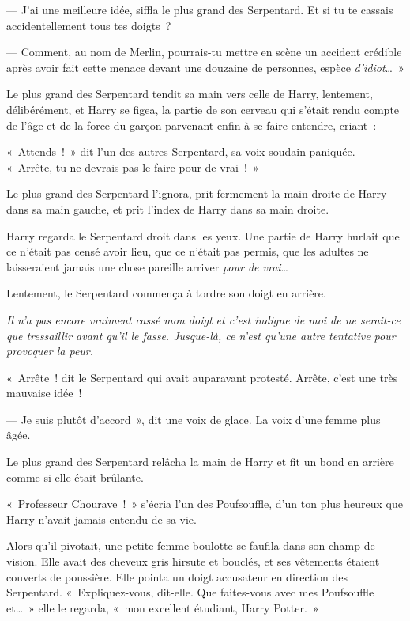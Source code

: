 --- J'ai une meilleure idée, siffla le plus grand des Serpentard. Et si tu te cassais accidentellement tous tes doigts~?

--- Comment, au nom de Merlin, pourrais-tu mettre en scène un accident crédible après avoir fait cette menace devant une douzaine de personnes, espèce \emph{d'idiot}…~»

Le plus grand des Serpentard tendit sa main vers celle de Harry, lentement, délibérément, et Harry se figea, la partie de son cerveau qui s'était rendu compte de l'âge et de la force du garçon parvenant enfin à se faire entendre, criant~: 

«~Attends~!~» dit l'un des autres Serpentard, sa voix soudain paniquée. «~Arrête, tu ne devrais pas le faire pour de vrai~!~»

Le plus grand des Serpentard l'ignora, prit fermement la main droite de Harry dans sa main gauche, et prit l'index de Harry dans sa main droite.

Harry regarda le Serpentard droit dans les yeux. Une partie de Harry hurlait que ce n'était pas censé avoir lieu, que ce n'était pas permis, que les adultes ne laisseraient jamais une chose pareille arriver \emph{pour de vrai}…

Lentement, le Serpentard commença à tordre son doigt en arrière.

\emph{Il n'a pas encore vraiment cassé mon doigt et c'est indigne de moi de ne serait-ce que tressaillir avant qu'il le fasse. Jusque-là, ce n'est qu'une autre tentative pour provoquer la peur.}

«~Arrête~! dit le Serpentard qui avait auparavant protesté. Arrête, c'est une très mauvaise idée~!

--- Je suis plutôt d'accord~», dit une voix de glace. La voix d'une femme plus âgée.

Le plus grand des Serpentard relâcha la main de Harry et fit un bond en arrière comme si elle était brûlante.

«~Professeur Chourave~!~» s'écria l'un des Poufsouffle, d'un ton plus heureux que Harry n'avait jamais entendu de sa vie.

Alors qu'il pivotait, une petite femme boulotte se faufila dans son champ de vision. Elle avait des cheveux gris hirsute et bouclés, et ses vêtements étaient couverts de poussière. Elle pointa un doigt accusateur en direction des Serpentard. «~Expliquez-vous, dit-elle. Que faites-vous avec mes Poufsouffle et…~» elle le regarda, «~mon excellent étudiant, Harry Potter.~»

